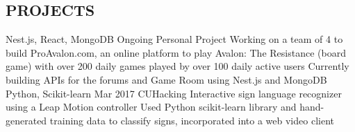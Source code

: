 \documentclass{aanguyen_res}
\begin{document}
\begin{main}
    \section{PROJECTS}
      \begin{entrylist}
        \rightentry%
          {Nest.js, React, MongoDB}%
          {\href{https://github.com/vck3000/ProAvalon/tree/newPA_staging}{}}%
          {Ongoing}%
          {Personal Project}%
          {\createlist%
            {%
              Working on a team of 4 to build ProAvalon.com, an online platform to play Avalon: %
              The Resistance (board game) with over 200 daily games played by over 100 daily active users %
            }%
            {%
               Currently building APIs for the forums and Game Room using Nest.js and MongoDB %
            }%
          }
        \rightentry%
          {Python, Scikit-learn}%
          {\href{https://github.com/aanguyen/SignBuddy}{}}%
          {Mar 2017}%
          {CUHacking}%
          {\createlist%
            {%
              Interactive sign language recognizer using a Leap Motion controller %
            }%
            {%
              Used Python scikit-learn library and hand-generated training data to classify signs, %
              incorporated into a web video client %
            }%
          }
      \end{entrylist}
  \end{main}
\end{document}
